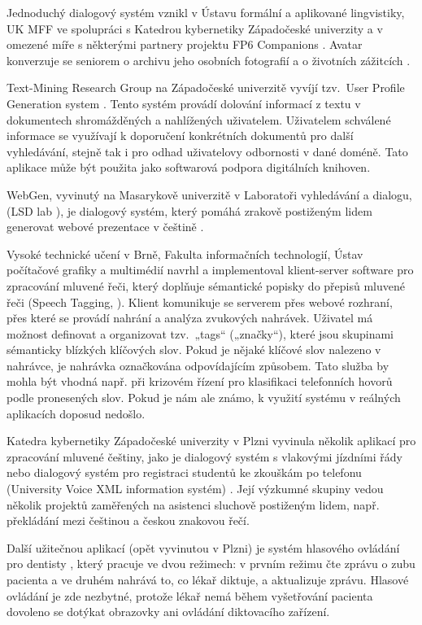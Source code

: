 \begin{multicols}{2}
Jednoduchý dialogový systém vznikl v Ústavu formální a aplikované lingvistiky, UK MFF ve spolupráci s Katedrou kybernetiky Západočeské univerzity a v omezené míře s některými partnery projektu FP6 Companions \cite{Note21}. Avatar konverzuje se seniorem o archivu jeho osobních fotografií a o životních zážitcích \cite{Ptacek2010,Romportl2010,GruberTihelka2010}.

Text-Mining Research Group na Západočeské univerzitě vyvíjí tzv.~User Profile Generation system \cite{Grolmus2003}. Tento systém provádí dolování informací z textu v dokumentech shromážděných a nahlížených uživatelem. Uživatelem schválené informace se využívají k doporučení konkrétních dokumentů pro další vyhledávání, stejně tak i pro odhad uživatelovy odbornosti v dané doméně. Tato aplikace může být použita jako softwarová podpora digitálních knihoven.

WebGen, vyvinutý na Masarykově univerzitě v Laboratoři vyhledávání a dialogu, (LSD lab \cite{Note22}), je dialogový systém, který pomáhá zrakově postiženým lidem generovat webové prezentace v češtině \cite{BartekPlhak2008}.

Vysoké technické učení v Brně, Fakulta informačních technologií, Ústav počítačové grafiky a multimédií navrhl a implementoval klient-server software pro zpracování mluvené řeči, který doplňuje sémantické popisky do přepisů mluvené řeči (Speech Tagging, \cite{Smrz2010}). Klient komunikuje se serverem přes webové rozhraní, přes které se provádí nahrání a analýza zvukových nahrávek. Uživatel má možnost definovat a organizovat tzv.~„tags“ („značky“), které jsou skupinami sémanticky blízkých klíčových slov. Pokud je nějaké klíčové slov nalezeno v nahrávce, je nahrávka označkována odpovídajícím způsobem. Tato služba by mohla být vhodná např. při krizovém řízení pro klasifikaci telefonních hovorů podle pronesených slov. Pokud je nám ale známo, k využití systému v reálných aplikacích doposud nedošlo.

Katedra kybernetiky Západočeské univerzity v Plzni vyvinula několik aplikací pro zpracování mluvené češtiny, jako je dialogový systém s vlakovými jízdními řády nebo dialogový systém pro registraci studentů ke zkouškám po telefonu (University Voice XML information systém) \cite{Note24}. Její výzkumné skupiny vedou několik projektů zaměřených na asistenci sluchově postiženým lidem, např. překládání mezi češtinou a českou znakovou řečí.

Další užitečnou aplikací (opět vyvinutou v Plzni) je systém hlasového ovládání pro dentisty \cite{Nagy2008}, který pracuje ve dvou režimech: v prvním režimu čte zprávu o zubu pacienta a ve druhém nahrává to, co lékař diktuje, a aktualizuje zprávu. Hlasové ovládání je zde nezbytné, protože lékař nemá během vyšetřování pacienta dovoleno se dotýkat obrazovky ani ovládání diktovacího zařízení.


\end{multicols}
